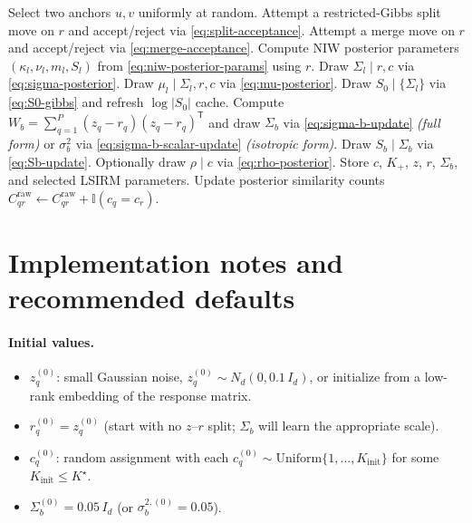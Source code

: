\documentclass[11pt]{article}
\newcommand{\ind}{\mathbb I}
\newcommand{\trans}{^{\mathsf T}}
\begin{document}
\begin{algorithm}[H]
\caption{One MCMC sweep: split--merge, mixture parameters, anchor covariance, storage}
\small
\begin{algorithmic}[1]
    \State Select two anchors $u,v$ uniformly at random.
        \State Attempt a restricted-Gibbs split move on $r$ and accept/reject via \eqref{eq:split-acceptance}.
    \Else
        \State Attempt a merge move on $r$ and accept/reject via \eqref{eq:merge-acceptance}.
    \EndIf
\EndFor
{}
    \State Compute NIW posterior parameters $(\kappa_l,\nu_l,m_l,S_l)$ from \eqref{eq:niw-posterior-params} using $r$.
    \State Draw $\Sigma_l\mid r,c$ via \eqref{eq:sigma-posterior}.
    \State Draw $\mu_l\mid \Sigma_l,r,c$ via \eqref{eq:mu-posterior}.
\EndFor
\State Draw $S_0\mid\{\Sigma_l\}$ via \eqref{eq:S0-gibbs} and refresh $\log|S_0|$ cache.
\State Compute $W_b=\sum_{q=1}^P (z_q-r_q)(z_q-r_q)\trans$ and draw $\Sigma_b$ via \eqref{eq:sigma-b-update} \emph{(full form)} or $\sigma_b^2$ via \eqref{eq:sigma-b-scalar-update} \emph{(isotropic form)}.
    \State Draw $S_b\mid \Sigma_b$ via \eqref{eq:Sb-update}.
\EndIf
\State Optionally draw $\rho\mid c$ via \eqref{eq:rho-posterior}.
    \State Store $c$, $K_+$, $z$, $r$, $\Sigma_b$, and selected LSIRM parameters.
    \State Update posterior similarity counts $C_{qr}^{\mathrm{raw}}\leftarrow C_{qr}^{\mathrm{raw}}+\ind(c_q=c_r)$.
\EndIf
\end{algorithmic}
\end{algorithm}

\section{Implementation notes and recommended defaults}
\label{sec:implementation-notes}

\paragraph{Initial values.}
\begin{itemize}[leftmargin=1.5em]
    \item $z_q^{(0)}$: small Gaussian noise, $z_q^{(0)}\sim N_d(0,0.1\,I_d)$, or initialize from a low-rank embedding of the response matrix.
    \item $r_q^{(0)}=z_q^{(0)}$ (start with no $z$--$r$ split; $\Sigma_b$ will learn the appropriate scale).
    \item $c_q^{(0)}$: random assignment with each $c_q^{(0)}\sim \mathrm{Uniform}\{1,\dots,K_{\mathrm{init}}\}$ for some $K_{\mathrm{init}}\leq K^\star$.
    \item $\Sigma_b^{(0)}=0.05\,I_d$ (or $\sigma_b^{2,(0)}=0.05$).
\end{itemize}
\end{document}
